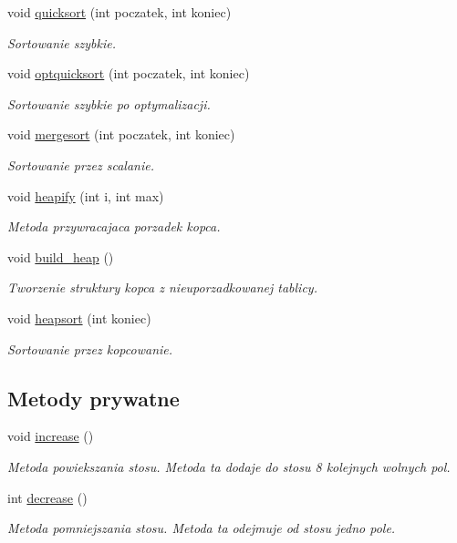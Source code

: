 \begin{DoxyCompactItemize}
void \hyperlink{class_stos_ad1abb0cc4ab8b243e1303540c022d3f4}{quicksort} (int poczatek, int koniec)
\begin{DoxyCompactList}\small\item\em Sortowanie szybkie. \end{DoxyCompactList}\item 
void \hyperlink{class_stos_a699ffb887c7e1b1b2fce87a9d57cc019}{optquicksort} (int poczatek, int koniec)
\begin{DoxyCompactList}\small\item\em Sortowanie szybkie po optymalizacji. \end{DoxyCompactList}\item 
void \hyperlink{class_stos_a3750c6dd385abbb93fc653fb0674da5f}{mergesort} (int poczatek, int koniec)
\begin{DoxyCompactList}\small\item\em Sortowanie przez scalanie. \end{DoxyCompactList}\item 
void \hyperlink{class_stos_a127d4a0d5dac0e51f45945daff3410c4}{heapify} (int i, int max)
\begin{DoxyCompactList}\small\item\em Metoda przywracajaca porzadek kopca. \end{DoxyCompactList}\item 
void \hyperlink{class_stos_a79e9040a576401d70143e28300b19be2}{build\-\_\-heap} ()
\begin{DoxyCompactList}\small\item\em Tworzenie struktury kopca z nieuporzadkowanej tablicy. \end{DoxyCompactList}\item 
void \hyperlink{class_stos_ac66fde0c17f950c901e85b3eeca45d97}{heapsort} (int koniec)
\begin{DoxyCompactList}\small\item\em Sortowanie przez kopcowanie. \end{DoxyCompactList}\end{DoxyCompactItemize}
\subsection*{Metody prywatne}
\begin{DoxyCompactItemize}
\item 
void \hyperlink{class_stos_aaf6e4717d1983c5351c9f5e9797368d3}{increase} ()
\begin{DoxyCompactList}\small\item\em Metoda powiekszania stosu. Metoda ta dodaje do stosu 8 kolejnych wolnych pol. \end{DoxyCompactList}\item 
int \hyperlink{class_stos_a1054dda0231b2516b6a04298801c0b27}{decrease} ()
\begin{DoxyCompactList}\small\item\em Metoda pomniejszania stosu. Metoda ta odejmuje od stosu jedno pole. \end{DoxyCompactList}\end{DoxyCompactItemize}
